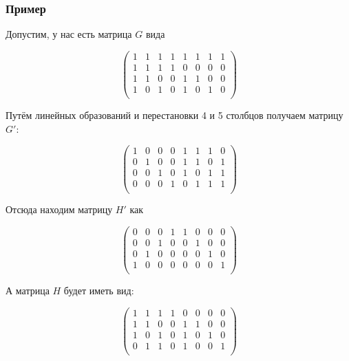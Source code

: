 \documentclass{article}
\begin{document}
\subsubsection*{Пример}

Допустим, у нас есть матрица $G$ вида

\begin{equation*}
\begin{pmatrix}
1 & 1 & 1 & 1 & 1 & 1 & 1 & 1 \\
1 & 1 & 1 & 1 & 0 & 0 & 0 & 0 \\
1 & 1 & 0 & 0 & 1 & 1 & 0 & 0 \\
1 & 0 & 1 & 0 & 1 & 0 & 1 & 0 \\
\end{pmatrix}
\end{equation*}

Путём линейных образований и перестановки 4 и 5 столбцов получаем матрицу $G'$:

\begin{equation*}
\begin{pmatrix}
1 & 0 & 0 & 0 & 1 & 1 & 1 & 0 \\
0 & 1 & 0 & 0 & 1 & 1 & 0 & 1 \\
0 & 0 & 1 & 0 & 1 & 0 & 1 & 1 \\
0 & 0 & 0 & 1 & 0 & 1 & 1 & 1 \\
\end{pmatrix}
\end{equation*}

Отсюда находим матрицу $H'$ как

\begin{equation*}
\begin{pmatrix}
0 & 0 & 0 & 1 & 1 & 0 & 0 & 0 \\
0 & 0 & 1 & 0 & 0 & 1 & 0 & 0 \\
0 & 1 & 0 & 0 & 0 & 0 & 1 & 0 \\
1 & 0 & 0 & 0 & 0 & 0 & 0 & 1 \\
\end{pmatrix}
\end{equation*}

А матрица $H$ будет иметь вид:

\begin{equation*}
\begin{pmatrix}
1 & 1 & 1 & 1 & 0 & 0 & 0 & 0 \\
1 & 1 & 0 & 0 & 1 & 1 & 0 & 0 \\
1 & 0 & 1 & 0 & 1 & 0 & 1 & 0 \\
0 & 1 & 1 & 0 & 1 & 0 & 0 & 1 \\
\end{pmatrix}
\end{equation*}
\end{document}
